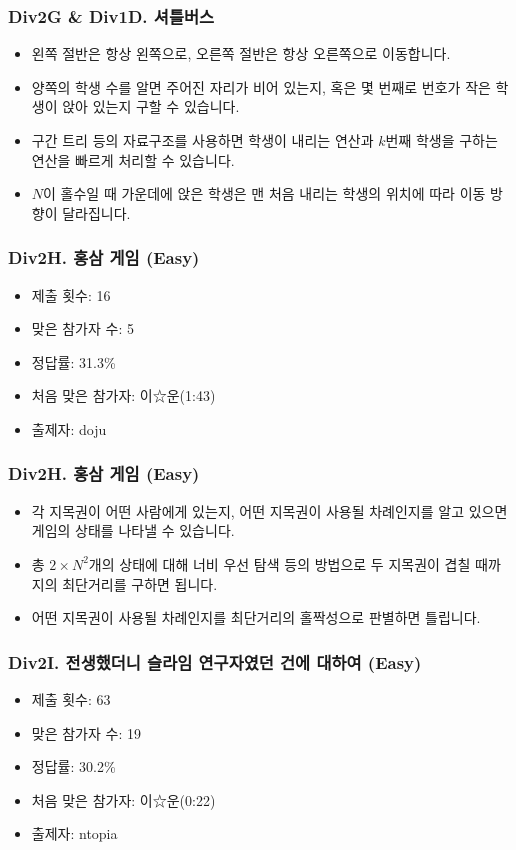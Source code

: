 \documentclass[xetex]{beamer}
\begin{document}
\begin{frame}
  \frametitle{Div2G \& Div1D. 셔틀버스}
  \begin{itemize}
    \item 왼쪽 절반은 항상 왼쪽으로, 오른쪽 절반은 항상 오른쪽으로 이동합니다.
    \item 양쪽의 학생 수를 알면 주어진 자리가 비어 있는지, 혹은 몇 번째로 번호가 작은 학생이 앉아 있는지 구할 수 있습니다.
    \item 구간 트리 등의 자료구조를 사용하면 학생이 내리는 연산과 $k$번째 학생을 구하는 연산을 빠르게 처리할 수 있습니다.
    \item $N$이 홀수일 때 가운데에 앉은 학생은 맨 처음 내리는 학생의 위치에 따라 이동 방향이 달라집니다.
  \end{itemize}
\end{frame}

\begin{frame}
  \frametitle{Div2H. 홍삼 게임 (Easy)}
  \begin{itemize}
    \item 제출 횟수: 16
    \item 맞은 참가자 수: 5
    \item 정답률: 31.3\%
    \item 처음 맞은 참가자: 이☆운(1:43)
    \item 출제자: doju
  \end{itemize}
\end{frame}

\begin{frame}
  \frametitle{Div2H. 홍삼 게임 (Easy)}
  \begin{itemize}
    \item 각 지목권이 어떤 사람에게 있는지, 어떤 지목권이 사용될 차례인지를 알고 있으면 게임의 상태를 나타낼 수 있습니다.
    \item 총 $2 \times N^{2}$개의 상태에 대해 너비 우선 탐색 등의 방법으로 두 지목권이 겹칠 때까지의 최단거리를 구하면 됩니다.
    \item 어떤 지목권이 사용될 차례인지를 최단거리의 홀짝성으로 판별하면 틀립니다.
  \end{itemize}
\end{frame}

\begin{frame}
  \frametitle{Div2I. 전생했더니 슬라임 연구자였던 건에 대하여 (Easy)}
  \begin{itemize}
    \item 제출 횟수: 63
    \item 맞은 참가자 수: 19
    \item 정답률: 30.2\%
    \item 처음 맞은 참가자: 이☆운(0:22)
    \item 출제자: ntopia
  \end{itemize}
\end{frame}
\end{document}
